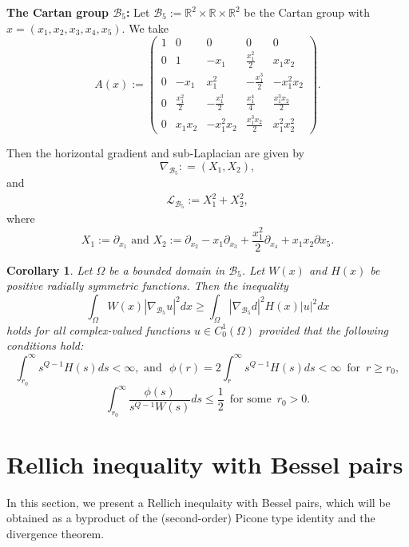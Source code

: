 \documentclass[a4paper,12pt,reqno]{amsart}
\theoremstyle{theorem}
\numberwithin{equation}{section}
\theoremstyle{plain}
\newtheorem{cor}[thm]{Corollary}
\theoremstyle{definition}
\theoremstyle{defi}
\begin{document}
\medskip
{\bf The Cartan group $\mathcal{B}_5$:} Let $\mathcal{B}_5:= \mathbb{R}^2 \times \mathbb{R}\times \mathbb{R}^2$ be the Cartan group with $x = (x_1,x_2,x_3,x_4,x_5)$. We take  
	$$A(x):=\begin{pmatrix}
1 & 0 & 0& 0& 0\\ 
0 & 1 & -x_1& \frac{x_1^2}{2}& x_1x_2\\
0 & -x_1& x_1^2 & - \frac{x_1^3}{2} & -x_1^2x_2\\
0 & \frac{x_1^2}{2} & - \frac{x_1^3}{2} & \frac{x_1^4}{4} & \frac{x_1^3x_2}{2} \\
0 & x_1x_2 &-x_1^2x_2 &  \frac{x_1^3x_2}{2}& x_1^2x_2^2
\end{pmatrix}.$$

Then the horizontal gradient and sub-Laplacian are given by 
\begin{equation*}
\nabla_{\mathcal{B}_5} : = (X_1,X_2),
\end{equation*}  
and
\begin{align*}
\mathcal{L}_{\mathcal{B}_5}:=   X_1^2 + X_2^2,
\end{align*}
where
\begin{equation*}
X_1:= \partial_{x_1}  \,\, \text{and} \,\, X_2:=\partial_{x_2} - x_1  \partial_{x_3} + \frac{x_1^2}{2} \partial_{x_4} + x_1x_2\partial x_5.
\end{equation*}

\begin{cor}
	Let $\Omega$ be a bounded domain in $\mathcal{B}_5$. Let $W(x)$ and $H(x)$ be positive radially symmetric functions. Then the inequality 
	\begin{equation}
	\int_{\Omega} W(x) |\nabla_{\mathcal{B}_5} u|^2 dx \geq \int_{\Omega} |\nabla_{\mathcal{B}_5}d|^2H(x) |u|^2 dx
	\end{equation}
	holds for all complex-valued functions $u \in C^1_0(\Omega)$ provided that the following conditions hold: 
	\begin{equation}
	\int_{r_0}^{\infty} s^{Q-1}H(s) ds< \infty, \,\, \text{and} \,\, \,\,	\phi(r) = 2 \int_{r}^{\infty} s^{Q-1}H(s) ds < \infty \,\,\, \text{for} \,\,\, r\geq r_0,
	\end{equation}
	\begin{equation}
	\int_{r_0}^{\infty}  \frac{\phi(s)}{s^{Q-1}W(s)} ds  \leq \frac{1}{2} \,\,\, \text{for some} \,\,\, r_0>0.
	\end{equation}
\end{cor}


\section{Rellich inequality with Bessel pairs}\label{sec-Rel}
In this section, we present a Rellich inequlaity with Bessel pairs, which will be obtained as a byproduct of the (second-order) Picone type identity and the divergence theorem. 
\end{document}
